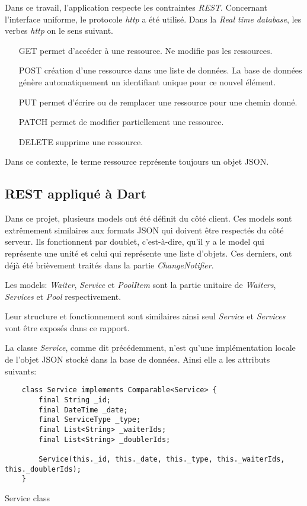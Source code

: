 Dans ce travail, l'application respecte les contraintes \textit{REST}. Concernant l'interface uniforme, le protocole \textit{http} a été utilisé. Dans la \textit{Real time database}, les verbes \textit{http} on le sens suivant.
\smallskip
\begin{itemize}
    \item [GET] permet d'accéder à une ressource. Ne modifie pas les ressources.
    \item [POST] création d'une ressource dans une liste de données. La base de données génère automatiquement un identifiant unique pour ce nouvel élément.
    \item [PUT] permet d'écrire ou de remplacer une ressource pour une chemin donné.
    \item [PATCH] permet de modifier partiellement une ressource.
    \item [DELETE] supprime une ressource.
\end{itemize}
\smallskip 
Dans ce contexte, le terme ressource représente toujours un objet JSON.


\subsection{REST appliqué à Dart}
Dans ce projet, plusieurs models ont été définit du côté client. Ces models sont extrêmement similaires aux formats JSON qui doivent être respectés du côté serveur. Ils fonctionnent par doublet, c'est-à-dire, qu'il y a le model qui représente une unité et celui qui représente une liste d'objets. Ces derniers, ont déjà été brièvement traités dans la partie \textit{ChangeNotifier}. 

Les models: \textit{Waiter}, \textit{Service} et \textit{PoolItem} sont la partie unitaire de \textit{Waiters}, \textit{Services} et \textit{Pool} respectivement.

Leur structure et fonctionnement sont similaires ainsi seul \textit{Service} et \textit{Services} vont être exposés dans ce rapport.

La classe \textit{Service}, comme dit précédemment, n'est qu'une implémentation locale de l'objet JSON stocké dans la base de données. Ainsi elle a les attributs suivants:
\begin{listing}[!h]
\begin{verbatim}
    class Service implements Comparable<Service> {
        final String _id;
        final DateTime _date;
        final ServiceType _type;
        final List<String> _waiterIds;
        final List<String> _doublerIds;
      
        Service(this._id, this._date, this._type, this._waiterIds, this._doublerIds);
    }
\end{verbatim}
\caption{Service class}
\label{code:servicesClass}
\end{listing}

